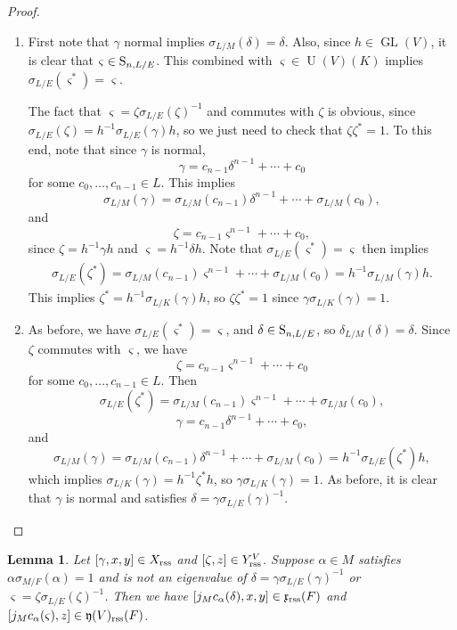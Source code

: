 \documentclass[11pt, reqno]{amsart}
\numberwithin{equation}{subsection}
\theoremstyle{plain}
\newtheorem{lem}[proposition]{Lemma}
\theoremstyle{definition}
\newcommand{\fy}{\mathfrak y}
\renewcommand{\S}{\textnormal{S}}
\DeclareMathOperator{\GL}{GL}
\DeclareMathOperator{\U}{U}
\newcommand{\rss}{\textnormal{rss}}
\begin{document}
\begin{proof}
\leavevmode
\begin{enumerate}[(1)]
\item First note that $\gamma$ normal implies
$\sigma_{L/M}(\delta) = \delta$. Also, since
$h \in \GL(V)$, it is clear that $\varsigma \in \S_{n, L/E}$.
This combined with $\varsigma \in \U(V)(K)$ implies
$\sigma_{L/E}(\varsigma^\ast) = \varsigma$.

The fact that $\varsigma = \zeta\sigma_{L/E}(\zeta)^{-1}$
and commutes with $\zeta$ is obvious, since
$\sigma_{L/E}(\zeta) = h^{-1}\sigma_{L/E}(\gamma) h$,
so we just
need to check that $\zeta\zeta^\ast = 1$. 
To this end, note that since $\gamma$ is normal,
\[
    \gamma = c_{n-1}\delta^{n-1} + \cdots + c_0
\]
for some $c_0, \dots, c_{n-1} \in L$.
This implies
\[
    \sigma_{L/M}(\gamma) = \sigma_{L/M}(c_{n-1})
    \delta^{n-1} + \cdots + \sigma_{L/M}(c_0),
\]
and
\[
    \zeta = c_{n-1}\varsigma^{n-1} + \cdots + c_0,
\]
since $\zeta = h^{-1}\gamma h$ and $\varsigma = h^{-1}\delta h$.
Note that $\sigma_{L/E}(\varsigma^\ast) = \varsigma$ then implies
\begin{align*}
    \sigma_{L/E}(\zeta^\ast) = \sigma_{L/M}(c_{n-1}) \varsigma^{n-1}
    + \cdots + \sigma_{L/M}(c_0) = h^{-1}\sigma_{L/M}(\gamma) h.
\end{align*}
This implies $\zeta^\ast = h^{-1}\sigma_{L/K}(\gamma) h$,
so $\zeta\zeta^\ast = 1$ since
$\gamma\sigma_{L/K}(\gamma) = 1$.

\item As before, we have $\sigma_{L/E}(\varsigma^\ast) = \varsigma$,
and $\delta \in \S_{n, L/E}$, so $\delta_{L/M}(\delta) 
= \delta$. Since $\zeta$ commutes with $\varsigma$,
we have
\[
    \zeta = c_{n-1} \varsigma^{n-1} + \cdots + c_0
\]
for some $c_0, \dots, c_{n-1} \in L$.
Then
\[
    \sigma_{L/E}(\zeta^\ast)
    = \sigma_{L/M}(c_{n-1}) \varsigma^{n-1} + \cdots + 
    \sigma_{L/M}(c_0),
\]
\[
    \gamma = c_{n-1} \delta^{n-1} + \cdots + c_0,
\]
and
\[
    \sigma_{L/M}(\gamma) =
    \sigma_{L/M}(c_{n-1})\delta^{n-1} + \cdots +
    \sigma_{L/M}(c_0)
    = h^{-1}\sigma_{L/E}(\zeta^\ast)h,
\]
which implies 
$\sigma_{L/K}(\gamma) = h^{-1}\zeta^\ast h$,
so $\gamma\sigma_{L/K}(\gamma) = 1$. As before,
it is clear that $\gamma$ is normal
and satisfies $\delta = \gamma\sigma_{L/E}(\gamma)^{-1}$.
\qedhere
\end{enumerate}
\end{proof}

\begin{lem}
\label{lem:rsscayley}
Let $[\gamma, x, y] \in X_\rss$ and
$[\zeta, z] \in Y_\rss^V$. Suppose $\alpha \in M$
satisfies $\alpha \sigma_{M/F}(\alpha) = 1$
and is not an eigenvalue of $\delta = \gamma\sigma_{L/E}(\gamma)^{-1}$
or $\varsigma = \zeta\sigma_{L/E}(\zeta)^{-1}$. 
Then we have
$[j_M c_\alpha(\delta), x, y] \in \mathfrak x_\rss(F)$
and $[j_M c_\alpha(\varsigma), z] \in \fy(V)_\rss(F)$.
\end{lem}
\end{document}
